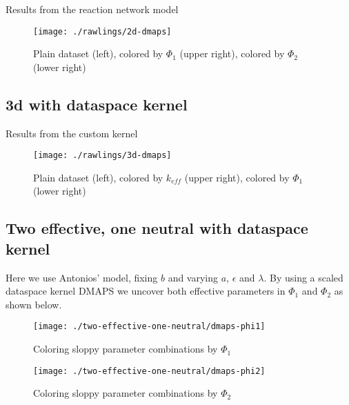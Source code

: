 \documentclass[11pt]{article}
\begin{document}
Results from the reaction network model

\begin{figure}[htbp]
  \centering
  \texttt{[image: ./rawlings/2d-dmaps]}
  \caption{Plain dataset (left), colored by $\Phi_1$ (upper right), colored by $\Phi_2$ (lower right)}
\end{figure}

\clearpage

\subsection{3d with dataspace kernel}

Results from the custom kernel

\begin{figure}[htbp]
  \centering
  \texttt{[image: ./rawlings/3d-dmaps]}
  \caption{Plain dataset (left), colored by $k_{eff}$ (upper right), colored by $\Phi_1$ (lower right)}
\end{figure}

\subsection{Two effective, one neutral with dataspace kernel}

Here we use Antonios' model, fixing $b$ and varying $a$, $\epsilon$
and $\lambda$. By using a scaled dataspace kernel DMAPS we uncover
both effective parameters in $\Phi_1$ and $\Phi_2$ as shown below.

\begin{figure}[htbp]
  \centering
  \texttt{[image: ./two-effective-one-neutral/dmaps-phi1]}
  \caption{Coloring sloppy parameter combinations by $\Phi_1$}
\end{figure}

\begin{figure}[htbp]
  \centering
  \texttt{[image: ./two-effective-one-neutral/dmaps-phi2]}
  \caption{Coloring sloppy parameter combinations by $\Phi_2$}
\end{figure}


% 
% 
\end{document}
